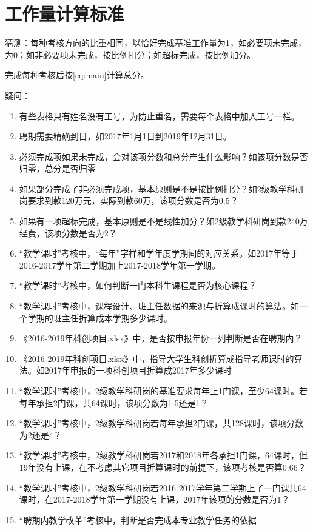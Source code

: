 \documentclass[UTF8,fontset=windowsnew]{ctexart}
\begin{document}
\section{工作量计算标准}
猜测：每种考核方向的比重相同，以恰好完成基准工作量为1，如必要项未完成，为0；如非必要项未完成，按比例扣分；如超标完成，按比例加分。\par
完成每种考核后按\autoref{eq:main}计算总分。\par
疑问：
\begin{enumerate}
  \item 有些表格只有姓名没有工号，为防止重名，需要每个表格中加入工号一栏。
  \item 聘期需要精确到日，如2017年1月1日到2019年12月31日。
  \item 必须完成项如果未完成，会对该项分数和总分产生什么影响？如该项分数是否归零，总分是否归零
  \item 如果部分完成了非必须完成项，基本原则是不是按比例扣分？如2级教学科研岗要求到款120万元，实际到款60万，该项分数是否为0.5？
  \item 如果有一项超标完成，基本原则是不是线性加分？如2级教学科研岗到款240万经费，该项分数是否为2？
  \item ``教学课时''考核中，``每年''字样和学年度学期间的对应关系。如2017年等于2016-2017学年第二学期加上2017-2018学年第一学期。
  \item ``教学课时''考核中，如何判断一门本科生课程是否为核心课程？
  \item ``教学课时''考核中，课程设计、班主任数据的来源与折算成课时的算法。如一个学期的班主任折算成本学期多少课时。
  \item 《2016-2019年科创项目.xlsx》中，是否按申报年份一列判断是否在聘期内？
  \item 《2016-2019年科创项目.xlsx》中，指导大学生科创折算成指导老师课时的算法。如2017年申报的一项科创项目折算成2017年多少课时
  \item ``教学课时''考核中，2级教学科研岗的基准要求每年上1门课，至少64课时。若每年承担2门课，共64课时，该项分数为1.5还是1？
  \item ``教学课时''考核中，2级教学科研岗若每年承担2门课，共128课时，该项分数为2还是4？
  \item ``教学课时''考核中，2级教学科研岗若2017和2018年各承担1门课，64课时，但19年没有上课，在不考虑其它项目折算课时的前提下，该项考核是否算0.66？
  \item ``教学课时''考核中，2级教学科研岗若2016-2017学年第二学期上了一门课共64课时，在2017-2018学年第一学期没有上课，2017年该项的分数是否为1？
  \item ``聘期内教学改革''考核中，判断是否完成本专业教学任务的依据

\end{enumerate}
\end{document}
